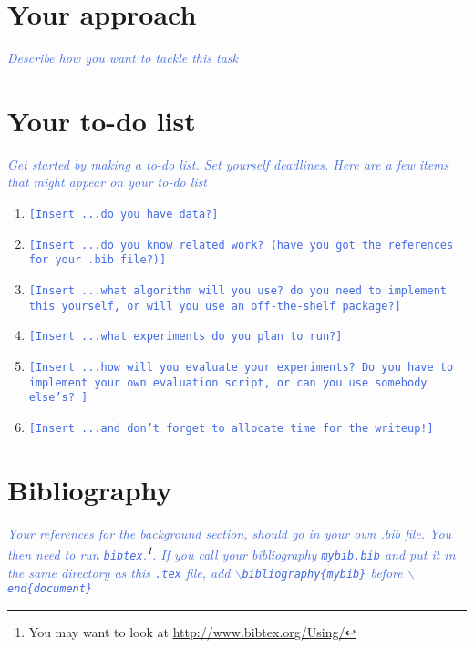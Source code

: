 \documentclass[11pt,letterpaper]{article}
\newcommand{\blue}[1]{\textcolor{RoyalBlue}{#1}}
\newcommand{\fillme}[1]{\blue{\texttt{[Insert #1]}}}
\newcommand{\instructions}[1]{\blue{\textit{#1}}}
\begin{document}
\section*{Your approach} 
\instructions{Describe how you want to tackle this task}

\section*{Your to-do list}
\instructions{Get started by making a to-do list. Set yourself deadlines. Here are a few
  items that might appear on your to-do list}
\begin{enumerate}
\item \fillme{...do you have data?}
\item \fillme{...do you know related work? (have you got the
    references  for your .bib file?)}
\item \fillme{...what algorithm will you use? do you need to implement
    this yourself, or will you use an off-the-shelf package?} 
\item \fillme{...what experiments do you plan to run?}
  \item \fillme{...how will you evaluate your experiments? Do you have
    to implement your own evaluation script, or can you use somebody
    else's? }
\item \fillme{...and don't forget to allocate time for the writeup!} 
\end{enumerate}

\section*{Bibliography}
\instructions{Your references for the background section, should go in your own .bib file. You then need to run {\tt bibtex}.\footnote{You may want to look at \url{http://www.bibtex.org/Using/}}.  If you call your bibliography {\tt mybib.bib} and put it in the same directory as this {\tt .tex} file, add {\tt$\backslash$bibliography\{mybib\}} before {\tt$\backslash$end\{document\}}
}


\end{document}
